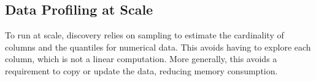 %
%
%
%
%

\subsection{Data Profiling at Scale}

To run at scale, discovery relies on sampling to estimate the cardinality of
columns and the quantiles for numerical data. This avoids having to explore each
column, which is not a linear computation.  More generally, this avoids a
requirement to copy or update the data, reducing memory consumption.

